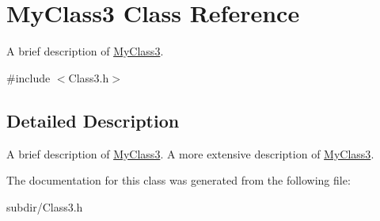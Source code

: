 \hypertarget{classMyClass3}{
\section{MyClass3 Class Reference}
\label{classMyClass3}
}


A brief description of \hyperlink{classMyClass3}{MyClass3}.  




{\ttfamily \#include $<$Class3.h$>$}



\subsection{Detailed Description}
A brief description of \hyperlink{classMyClass3}{MyClass3}. A more extensive description of \hyperlink{classMyClass3}{MyClass3}. 

The documentation for this class was generated from the following file:\begin{DoxyCompactItemize}
\item 
subdir/Class3.h\end{DoxyCompactItemize}

